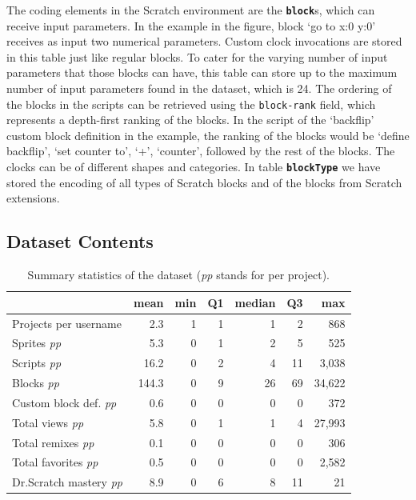 \documentclass[10pt, conference]{IEEEtran}
\begin{document}
The coding elements in the Scratch environment are the \textbf{\texttt{block}}s, which can receive input parameters.
In the example in the figure, block `go to x:0 y:0' receives as input two numerical parameters.
Custom clock invocations are stored in this table just like regular blocks.
To cater for the varying number of input parameters that those blocks can have, this table can store up to the maximum number of input parameters found in the dataset, which is 24.
The ordering of the blocks in the scripts can be retrieved using the \texttt{block-rank} field, which represents a depth-first ranking of the blocks.
In the script of the `backflip' custom block definition in the example, the ranking of the blocks would be `define backflip', `set counter to', `+', `counter', followed by the rest of the blocks.
The clocks can be of different shapes and categories.
In table \textbf{\texttt{blockType}} we have stored the encoding of all types of Scratch blocks and of the blocks from Scratch extensions.

\subsection{Dataset Contents}


\begin{table}[]
	\centering
	\begin{tabular}{lrrrrrr}
		&\textbf{mean}&\textbf{min}&\textbf{Q1}&\textbf{median}&\textbf{Q3}&\textbf{max}\\
		\hline
		Projects per username&2.3&1&1&1&2&868\\
		Sprites \emph{pp}&5.3&0&1&2&5&525\\
		Scripts \emph{pp}&16.2&0&2&4&11&3,038\\
		Blocks \emph{pp}&144.3&0&9&26&69&34,622\\
		Custom block def. \emph{pp}&0.6&0&0&0&0&372\\
		Total views \emph{pp}&5.8&0&1&1&4&27,993\\
		Total remixes \emph{pp}&0.1&0&0&0&0&306\\
		Total favorites \emph{pp}&0.5&0&0&0&0&2,582\\
		Dr.Scratch mastery \emph{pp}&8.9&0&6&8&11&21\\
		\hline
	\end{tabular}
	\caption{Summary statistics of the dataset (\emph{pp} stands for per project).}
	\label{tbl-stats}
\end{table}
\end{document}
